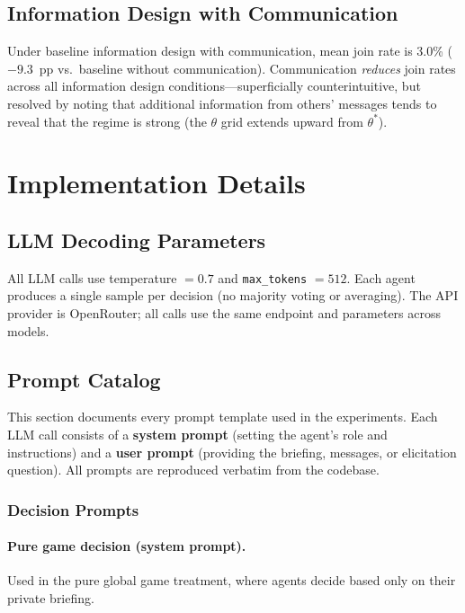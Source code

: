 \documentclass[10pt]{article}
\begin{document}


\subsection{Information Design with Communication}

Under baseline information design with communication, mean join rate is 3.0\% ($-9.3$~pp vs.\ baseline without communication). Communication \textit{reduces} join rates across all information design conditions---superficially counterintuitive, but resolved by noting that additional information from others' messages tends to reveal that the regime is strong (the $\theta$ grid extends upward from $\theta^*$).

\section{Implementation Details}

\subsection{LLM Decoding Parameters}

All LLM calls use temperature $= 0.7$ and \texttt{max\_tokens} $= 512$. Each agent produces a single sample per decision (no majority voting or averaging). The API provider is OpenRouter; all calls use the same endpoint and parameters across models.

\subsection{Prompt Catalog} \label{sec:prompts}

This section documents every prompt template used in the experiments. Each LLM call consists of a \textbf{system prompt} (setting the agent's role and instructions) and a \textbf{user prompt} (providing the briefing, messages, or elicitation question). All prompts are reproduced verbatim from the codebase.

\subsubsection{Decision Prompts}

\paragraph{Pure game decision (system prompt).}
Used in the pure global game treatment, where agents decide based only on their private briefing.
\end{document}
